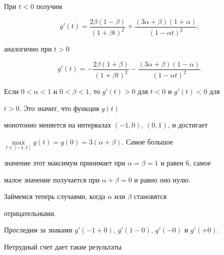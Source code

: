 При $t<0$ получим


$$


g'(t)=\frac{2\beta(1-\beta)}{(1+\beta t)^2}+


\frac{(3\alpha+\beta)(1+\alpha)}{(1-\alpha t)^2};


$$


аналогично при $t>0$


$$


g'(t)=-\frac{2\beta(1+\beta)}{(1+\beta t)^2}-


\frac{(3\alpha+\beta)(1-\alpha)}{(1-\alpha t)^2}.


$$





Если $0<\alpha<1$ и $0<\beta<1$, то $g'(t)>0$ для $t<0$ и $g'(t)<0$ для


$t>0$. Это значит, что функция $g(t)$


монотонно меняется на интервалах $(-1,0)$, $(0,1)$, и достигает


$\max\limits_{t\in[-1,1]}g(t)=g(0)=3(\alpha+\beta)$. Самое большое


значение этот максимум принимает при $\alpha=\beta=1$ и равен 6, самое


малое значение получается при $\alpha+\beta=0$ и равно оно нулю.





Займемся теперь случаями, когда $\alpha$ или $\beta$ становятся


отрицательными.


Проследим за знаками $g'(-1+0)$, $g'(1-0)$, $g'(-0)$ и $g'(+0)$.


Нетрудный счет дает такие результаты


